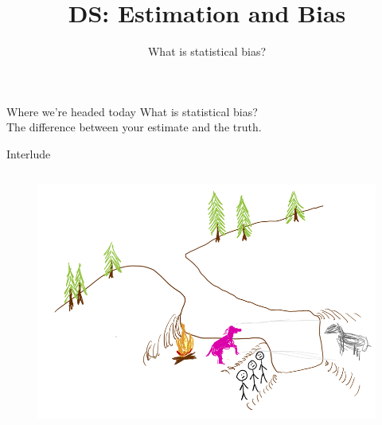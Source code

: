 \documentclass[aspectratio=169]{../latex_main/tntbeamer}  %
\title[Introduction]{DS: Estimation and Bias}
\subtitle{What is statistical bias?}
\begin{document}
	
	\maketitle
	
	\begin{frame}[c]{Where we’re headed today}
	    What is statistical bias?\\
	    \hspace{4cm} The difference between your estimate and the truth.

	\end{frame}
	
		\begin{frame}{Interlude}
	    \begin{columns}
	        \begin{column}{.5\textwidth}
	     
	           \begin{figure}
	               \includegraphics[scale=.55]{Bild24}
	           \end{figure}
	        \end{column}
	        

\end{columns}
\end{frame}
\end{document}
